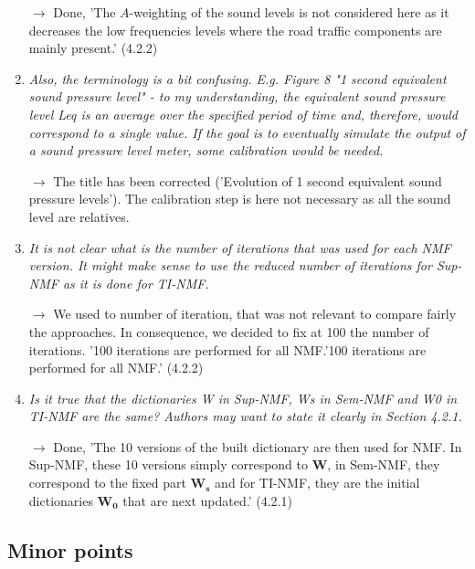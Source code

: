 \documentclass[10pt]{article}
\begin{document}
\begin{enumerate}
$\rightarrow$ Done, 'The $A$-weighting of the sound levels is not considered here as it decreases the low frequencies levels where the road traffic components are mainly present.' (4.2.2)

\item \emph{Also, the terminology is a bit confusing. E.g. Figure 8 "1 second equivalent sound pressure level" - to my understanding, the equivalent sound pressure level Leq is an average over the specified period of time and, therefore, would correspond to a single value. If the goal is to eventually simulate the output of a sound pressure level meter, some calibration would be needed.}

$\rightarrow$ The title has been corrected ('Evolution of 1 second equivalent sound pressure levels'). The calibration step is here not necessary as all the sound level are relatives.

\item \emph{It is not clear what is the number of iterations that was used for each NMF version. It might make sense to use the reduced number of iterations for Sup-NMF as it is done for TI-NMF.}

$\rightarrow$ We used to number of iteration, that was not relevant to compare fairly the approaches. In consequence, we decided to fix at 100 the number of iterations. '100 iterations are performed for all NMF.'100 iterations are performed for all NMF.' (4.2.2)

\item \emph{Is it true that the dictionaries W in Sup-NMF, Ws in Sem-NMF and W0 in TI-NMF are the same? Authors may want to state it clearly in Section 4.2.1.}

$\rightarrow$ Done, 'The 10 versions of the built dictionary are then used for NMF. In Sup-NMF, these 10 versions simply correspond to $\mathbf{W}$, in Sem-NMF, they correspond to the fixed part $\mathbf{W_s}$ and for TI-NMF, they are the initial dictionaries $\mathbf{W_0}$ that are next updated.' (4.2.1)

\end{enumerate}
\subsection{Minor points}
\end{document}
